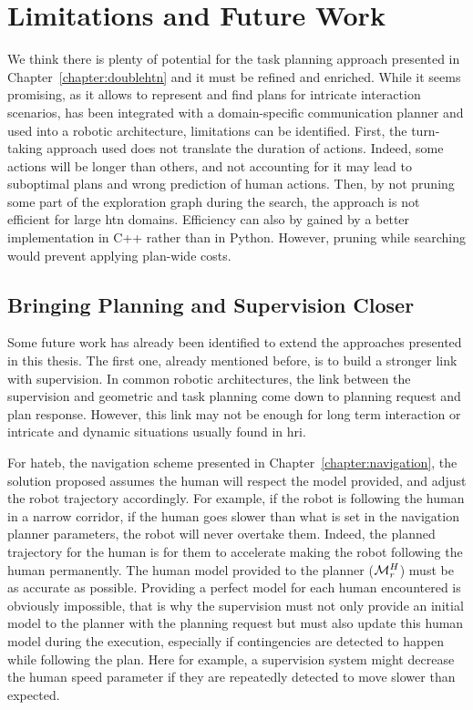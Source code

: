\documentclass[a4paper,11pt,twoside]{StyleThese}
\begin{document}
\section*{Limitations and Future Work}
We think there is plenty of potential for the task planning approach presented in Chapter~\ref{chapter:doublehtn} and it must be refined and enriched. While it seems promising, as it allows to represent and find plans for intricate interaction scenarios, has been integrated with a domain-specific communication planner and used into a robotic architecture, limitations can be identified. First, the turn-taking approach used does not translate the duration of actions. Indeed, some actions will be longer than others, and not accounting for it may lead to suboptimal plans and wrong prediction of human actions. Then, by not pruning some part of the exploration graph during the search, the approach is not efficient for large \acrshort{htn} domains. Efficiency can also by gained by a better implementation in C++ rather than in Python. However, pruning while searching would prevent applying plan-wide costs.


\subsection*{Bringing Planning and Supervision Closer}
Some future work has already been identified to extend the approaches presented in this thesis. The first one, already mentioned before, is to build a stronger link with supervision. In common robotic architectures, the link between the supervision and geometric and task planning come down to planning request and plan response. However, this link may not be enough for long term interaction or intricate and dynamic situations usually found in \acrshort{hri}.

For \acrshort{hateb}, the navigation scheme presented in Chapter~\ref{chapter:navigation}, the solution proposed assumes the human will respect the model provided, and adjust the robot trajectory accordingly. For example, if the robot is following the human in a narrow corridor, if the human goes slower than what is set in the navigation planner parameters, the robot will never overtake them. Indeed, the planned trajectory for the human is for them to accelerate making the robot following the human permanently. The human model provided to the planner ($\mathcal{M}^H_r$) must be as accurate as possible. Providing a perfect model for each human encountered is obviously impossible, that is why the supervision must not only provide an initial model to the planner with the planning request but must also update this human model during the execution, especially if contingencies are detected to happen while following the plan. Here for example, a supervision system might decrease the human speed parameter if they are repeatedly detected to move slower than expected.
\end{document}
